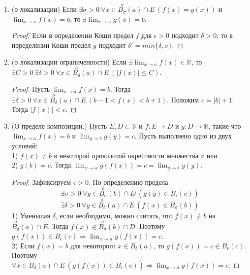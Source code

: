 \begin{enumerate}
    Заключение следует понимать так: если существует величина справа, то существует величина слева и они равны.
    \begin{proof}
        Рассмотрим произвольную последовательность $\{x_{n}\} \in E$ с условиями $x_{n} \to a$ и $x_{n} \neq a$. Тогда $f(x_{n}) \to b$ и $g(x_{n}) \to c$. По свойствам предела последовательности $f(x_{n}) \pm g(x_{n}) \to b \pm c$, $f(x_{n}) \cdot g(x_{n}) \to b \cdot c$, $\frac{f(x_{n})}{g(x_{n})} \to \frac{b}{c}$. Осталось воспользоваться определением предела по Гейне.
    \end{proof}
    \item (о локализации) Если $\exists \sigma > 0 \ \forall x \in \overset{o}{B_{\sigma}}(a) \cap E \ (f(x) = g(x))$ и $\lim_{x \rightarrow a} f(x) = b$, то $\exists \lim_{x \rightarrow a} g(x) = b$.
    \begin{proof}
        Если в определении Коши предел $f$ для $\epsilon > 0$ подходит $\delta > 0$, то в поределении Коши предел $g$ подходит $\delta' = min\{\delta, \sigma\}$.
    \end{proof}
    \item (о локализации ограниченности) Если $\exists \lim_{x \rightarrow a} f(x) \in \mathds{R}$, то $\exists C > 0 \ \exists \delta > 0 \ \forall x \in \overset{o}{B_{\delta}}(a) \cap E \ (|f(x)| \leq C)$.
    \begin{proof}
        Пусть $\lim_{x \rightarrow a} f(x) = b$. Тогда $\exists \delta > 0 \ \forall x \in \overset{o}{B_{\delta}}(a) \cap E \ (b - 1 < f(x) < b + 1)$. Положим $c = |b| + 1$. Тогда $|f(x)| < c$.
    \end{proof}
    \item (О пределе композиции.) Пусть $E, D \subset \mathds{R}$ и $f: E \longrightarrow D$ и $g: D \longrightarrow \mathds{R}$, такие что $\lim_{x \rightarrow a} f(x) = b$ и $\lim_{y \rightarrow b} g(y) = c$. Пусть выполнено одно из двух условий: 
    \\
    1) $f(x) \neq b$ в некоторой проколотой окрестности множества $a$ или 
    \\
    2) $g(b) = c$. Тогда $\lim_{x \rightarrow a} g(f(x)) = c = \lim_{y \rightarrow b} g(y)$.
    \begin{proof}
        Зафиксируем $\epsilon > 0$. По определению предела
        \[\exists \sigma > 0 \ \forall y \in \overset{o}{B_{\sigma}}(b) \cap D \ (g(y) \in \overset{}{B_{\epsilon}}(c))\]
        \[\exists \delta > 0 \ \forall y \in \overset{o}{B_{\delta}}(a) \cap E \ (f(x) \in \overset{}{B_{\sigma}}(b))\]
        1) Уменьшая $\delta$, если необходимо, можно считать, что $f(x) \neq b$ на $\overset{o}{B_{\delta}}(a) \cap E$. Тогда $f(x) \in \overset{o}{B_{\sigma}}(b) \cap D$. Поэтому $g(f(x)) \in \overset{}{B_{\epsilon}}(c) \Rightarrow \lim_{x \rightarrow a} g(f(x)) = c$.
        \\
        2) Если $f(x) = b$ для некоторого $x \in \overset{}{B_{\delta}}(a)$, то $g(f(x)) = c \in \overset{}{B_{\epsilon}}(c)$. Поэтому $\forall x \in \overset{}{B_{\delta}}(a) \cap E \ (g(f(x)) \in \overset{}{B_{\epsilon}}(c)) \Rightarrow \lim_{x \rightarrow a} g(f(x)) = c$.
    \end{proof}
\end{enumerate}
